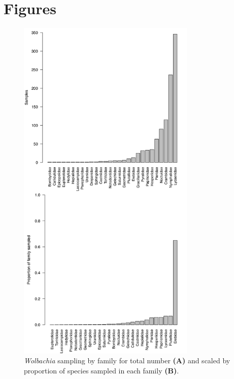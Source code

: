 \documentclass{frontiersSCNS} %
\begin{document}

\section*{Figures}

\begin{figure}[h!]
\begin{center}
\includegraphics[width=85mm]{Fams_n_Props.pdf}%
\end{center}
\caption{\textit{Wolbachia} sampling by family for total number \textbf{(A)} and scaled by proportion of species sampled in each family \textbf{(B)}.}
\label{histograms}
\end{figure}

\newpage
\end{document}
